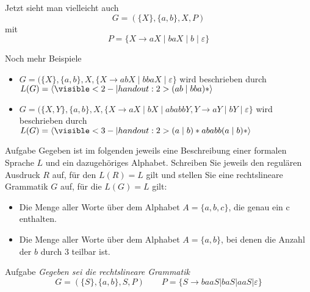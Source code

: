 \begin{frame}
	Jetzt sieht man vielleicht auch $$G = (\{X\}, \{a, b\}, X, P )$$ mit $$P = \{X \to aX \mid baX \mid b \mid \varepsilon \}$$
\end{frame}

\begin{frame}{Noch mehr Beispiele}
	\begin{itemize}
		\item $G = (\{X \}, \{a, b\}, X , \{X \to abX \mid bbaX \mid \varepsilon \}$ wird beschrieben durch
			$L(G) = \lang{\visible<2-|handout:2>{ (ab\mid bba)\ast }} $
		\item $G = (\{X , Y\}, \{a, b\}, X , \{X \to aX \mid bX \mid ababbY , Y \to aY \mid bY \mid \varepsilon \}$ wird beschrieben durch 
			$L(G) = \lang{\visible<3-|handout:2>{ (a\mid b)\ast ababb(a\mid b)\ast }} $
	\end{itemize}
\end{frame}

\begin{frame}{Aufgabe}
	Gegeben ist im folgenden jeweils eine Beschreibung einer formalen Sprache $L$ und ein dazugehöriges Alphabet. Schreiben Sie jeweils den regulären Ausdruck $R$ auf, für den $L(R) = L $ gilt und stellen Sie eine rechtslineare Grammatik $G$ auf, für die $L(G) = L $ gilt:
	\begin{itemize}
		\item Die Menge aller Worte über dem Alphabet $A=\{a,b,c\}$, die genau ein c enthalten. \\
		\visible<2-|handout:2>{
			\emph{Lösung}: $(a|b)*c(a|b)*$
		}
		\item Die Menge aller Worte über dem Alphabet $A=\{a,b\}$, bei denen die Anzahl der $b$ durch 3 teilbar ist. \\
		\visible<3-|handout:2>{
			\emph{Lösung}: $a*(ba*ba*ba*)*$
		}
	\end{itemize}
\end{frame}

\begin{frame}{Aufgabe}
	\textit{Gegeben sei die rechtslineare Grammatik } $$ G= (\{S\},\{a,b\},S,P) \qquad P = \{S\to baaS | baS | aaS | \varepsilon \} $$
	\begin{itemize}
	\end{itemize}
\end{frame}



